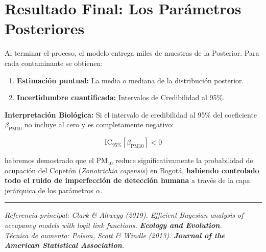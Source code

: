 \documentclass[12pt, a4paper]{article}
\begin{document}
\section{Resultado Final: Los Parámetros Posteriores}

Al terminar el proceso, el modelo entrega miles de muestras de la Posterior. Para cada contaminante se obtienen:

\begin{enumerate}
  \item \textbf{Estimación puntual:} La media o mediana de la distribución posterior.
  \item \textbf{Incertidumbre cuantificada:} Intervalos de Credibilidad al 95\%.
\end{enumerate}

\medskip
\textbf{Interpretación Biológica:}
Si el intervalo de credibilidad al 95\% del coeficiente $\beta_{\text{PM10}}$ no incluye al cero y es completamente negativo:

\begin{equation}
  \text{IC}_{95\%}[\beta_{\text{PM10}}] < 0
\end{equation}

\noindent habremos demostrado que el $\text{PM}_{10}$ reduce significativamente la probabilidad de ocupación del Copetón (\textit{Zonotrichia capensis}) en Bogotá, \textbf{habiendo controlado todo el ruido de imperfección de detección humana} a través de la capa jerárquica de los parámetros $\alpha$.

\vspace{1em}
\hrule
\vspace{0.5em}
\begin{center}
  \small\textit{Referencia principal: Clark \& Altwegg (2019). Efficient Bayesian analysis of occupancy models with logit link functions. \textbf{Ecology and Evolution}. \\ Técnica de aumento: Polson, Scott \& Windle (2013). \textbf{Journal of the American Statistical Association}.}
\end{center}
\end{document}

